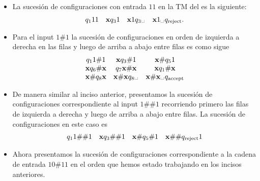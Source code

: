 \documentclass{article}
\newcommand\blank{\text{\textvisiblespace\hspace{1pt}}}
\begin{document}
\Proof 
\begin{itemize}
    \item [\colemph{a)}] La sucesión de configuraciones con entrada $11$ en la TM del  es la siguiente: 
    \[
        \begin{matrix}
            q_111 & \x q_3 1 & \x 1 q_3 \blank & \x 1 \blank q_{\text{reject}}.
        \end{matrix}
    \]

    \item [\colemph{b)}] Para el input $1\# 1$ la sucesión de configuraciones en orden de izquierda a derecha en las filas y luego de arriba a abajo entre filas es como sigue
    \[
        \begin{matrix}
        q_1 1\# 1 & \x q_3 \# 1 & \x\# q_5 1\\ 
        \x q_6 \# \x & q_7\x \# \x & \x q_1 \# \x \\ 
        \x \# q_8\x & \x \# \x q_8 \blank & \x\#\x\blank q_{\text{accept}}
        \end{matrix}
    \]

    \item [\colemph{c)}] De manera similar al inciso anterior, presentamos la sucesión de configuraciones correspondiente al input $1\#\#1$ recorriendo primero las filas de izquierda a derecha y luego de arriba a abajo entre filas. La sucesión de configuraciones en este caso es
    \[
        \begin{matrix}
            q_1 1\#\# 1 & \mathbf{x} q_3\#\# 1 & \mathbf{x}\# q_5 \# 1 & \mathbf{x}\#\# q_{\text{reject}} 1
        \end{matrix}
    \]

    \item [\colemph{d)}] Ahora presentamos la sucesión de configuraciones correspondiente a la cadena de entrada $10\# 11$ en el orden que hemos estado trabajando en los incisos anteriores. 
    

\end{itemize}
\end{document}
